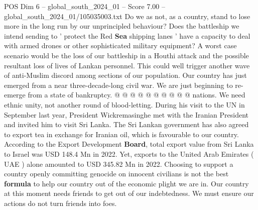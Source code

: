 \begin{textsample}{POS Dim 6 – global\_south\_2024\_01 – Score 7.00 – global\_south\_2024\_01/105035003.txt}
Do we as not, as a country, stand to lose more in the long run by our unprincipled behaviour?
Does the battleship we intend sending to ' protect the Red \textbf{Sea} shipping lanes ' have a capacity to deal with armed drones or other sophisticated military equipment?
A worst case scenario would be the loss of our battleship in a Houthi attack and the possible resultant loss of lives of Lankan personnel.
This could well trigger another wave of anti-Muslim discord among sections of our population.
Our country has just emerged from a near three-decade-long civil war.
We are just beginning to re-emerge from a state of bankruptcy. @ @ @ @ @ @ @ @ @ @ nations.
We need ethnic unity, not another round of blood-letting.
During his visit to the UN in September last year, President Wickremasinghe met with the Iranian President and invited him to visit Sri Lanka.
The Sri Lankan government has also agreed to export tea in exchange for Iranian oil, which is favourable to our country.
According to the Export Development \textbf{Board}, total export value from Sri Lanka to Israel was USD 148.4 Mn in 2022.
Yet, exports to the United Arab Emirates ( UAE ) alone amounted to USD 345.82 Mn in 2022.
Choosing to support a country openly committing genocide on innocent civilians is not the best \textbf{formula} to help our country out of the economic plight we are in.
Our country at this moment needs friends to get out of our indebtedness.
We must ensure our actions do not turn friends into foes.

\end{textsample}
